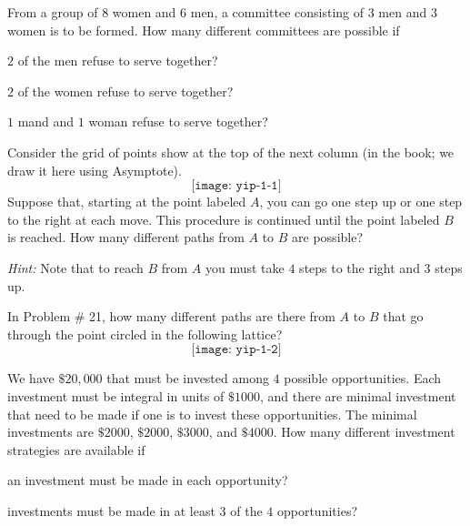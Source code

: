 \begin{problem}[Ross, \S 1, \# 19]
  From a group of \(8\) women and \(6\) men, a committee consisting of
  \(3\) men and \(3\) women is to be formed. How many different committees
  are possible if
  \begin{alphlist}
  \item \(2\) of the men refuse to serve together?
  \item \(2\) of the women refuse to serve together?
  \item \(1\) mand and \(1\) woman refuse to serve together?
  \end{alphlist}
\end{problem}
\begin{solution*}
\end{solution*}

\begin{problem}[Ross, \S 1, \# 21]
  Consider the grid of points show at the top of the next column (in the
  book; we draw it here using Asymptote).
  \[
    \texttt{[image: yip-1-1]}
  \]
  Suppose that, starting at the point labeled \(A\), you can go one step up
  or one step to the right at each move. This procedure is continued until
  the point labeled \(B\) is reached. How many different paths from \(A\)
  to \(B\) are possible?

  \noindent\emph{Hint:} Note that to reach \(B\) from \(A\) you must take
  \(4\) steps to the right and \(3\) steps up.
\end{problem}
\begin{solution*}
\end{solution*}

\begin{problem}[Ross, \S 1, \# 22]
  In Problem \# 21, how many different paths are there from \(A\) to \(B\)
  that go through the point circled in the following lattice?
  \[
    \texttt{[image: yip-1-2]}
  \]
\end{problem}
\begin{solution*}
\end{solution*}

\begin{problem}[Ross, \S 1, \# 33]
  We have \(\$ 20,000\) that must be invested among \(4\) possible
  opportunities. Each investment must be integral in units of \(\$1000\),
  and there are minimal investment that need to be made if one is to invest
  these opportunities. The minimal investments are \(\$2000\), \(\$2000\),
  \(\$3000\), and \(\$4000\). How many different investment strategies are
  available if
  \begin{alphlist}
  \item an investment must be made in each opportunity?
  \item investments must be made in at least \(3\) of the \(4\)
    opportunities?
  \end{alphlist}
\end{problem}
\begin{solution*}
\end{solution*}

